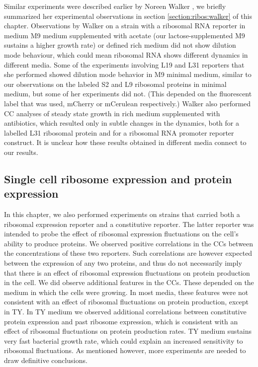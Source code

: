Similar experiments were described earlier by Noreen Walker \cite{Walker2016t}, 
we briefly summarized her experimental observations in section \ref{section:ribos:walker} of this chapter.
%
Observations by Walker on a strain with a ribosomal RNA reporter in medium M9 medium supplemented with acetate (our lactose-supplemented M9 sustains a higher growth rate) or defined rich medium did not show dilution mode behaviour, which could mean ribosomal RNA shows different dynamics in different media.
%
Some of the experiments involving L19 and L31 reporters that she performed showed dilution mode behavior in M9 minimal medium, similar to our observations on the labeled S2 and L9 ribosomal proteins in minimal medium, but some of her experiments did not. (This depended on the fluorescent label that was used, mCherry or mCerulean respectively.)
%
Walker also performed CC analyses of steady state growth in rich medium supplemented with antibiotics, which resulted only in subtle changes in the dynamics, both for a labelled L31 ribosomal protein and for a ribosomal RNA promoter reporter construct.
%
It is unclear how these results obtained in different media connect to our results.

\subsection{Single cell ribosome expression and protein expression}

In this chapter, we also performed experiments on strains that carried both a ribosomal expression reporter and a constitutive reporter.
The latter reporter was intended to probe the effect of ribosomal expression fluctuations on the cell's ability to produce proteins.
%
We observed positive correlations in the CCs between the concentrations of these two reporters. 
%
Such correlations are however 
%
expected between the expression of any two proteins, 
and thus do not necessarily imply that there is an effect of ribosomal expression fluctuations on protein production in the cell.
%
We did observe additional features in the CCs. 
These depended on the medium in which the cells were growing.
%
In most media, these features were not consistent with an effect of ribosomal fluctuations on protein production,
except in TY.
%
In TY medium we observed additional correlations between constitutive protein expression and past ribosome expression,
which is consistent with an effect of ribosomal fluctuations on protein production rates.
%
TY medium sustains very fast bacterial growth rate, 
which could explain an increased sensitivity to ribosomal fluctuations.
%
As mentioned however, more experiments are needed to draw definitive conclusions.


